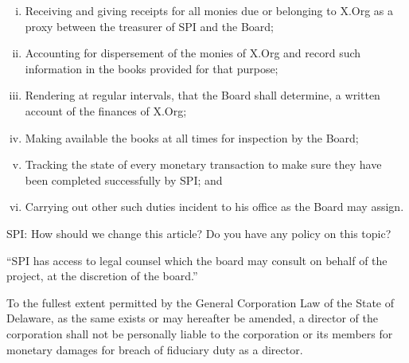 \documentclass[10pt, english]{bylaws}
\begin{document}
\begin{enumerate}[(i)\hspace{.2cm}]
	\item Receiving and giving receipts for all monies due or belonging to
	X.Org as a proxy between the treasurer of SPI and the Board;

	\item Accounting for dispersement of the monies of X.Org and record such
	information in the books provided for that purpose;

	\item Rendering at regular intervals, that the Board shall determine, a
	written account of the finances of X.Org;

	\item Making available the books at all times for inspection by the
	Board;

	\item Tracking the state of every monetary transaction to make sure
	they have been completed successfully by SPI; and

	\item Carrying out other such duties incident to his office as the
	Board may assign.
\end{enumerate}


SPI: How should we change this article? Do you have any policy on this topic?

``SPI has access to legal counsel which the board may consult on behalf of the
project, at the discretion of the board.''

To the fullest extent permitted by the General Corporation Law of the State of
Delaware, as the same exists or may hereafter be amended, a director of the
corporation shall not be personally liable to the corporation or its members for
monetary damages for breach of fiduciary duty as a director.
\end{document}
